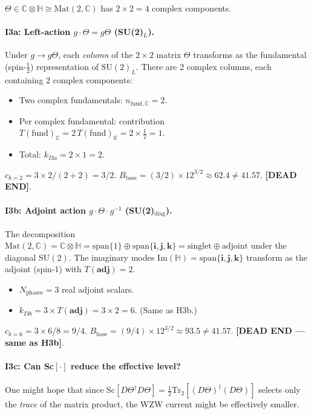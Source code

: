 \documentclass[11pt,a4paper]{article}
\theoremstyle{definition}
\theoremstyle{remark}
\begin{document}
$\Theta \in \mathbb{C}\otimes\mathbb{H} \cong \mathrm{Mat}(2,\mathbb{C})$
has $2\times 2 = 4$ complex components.

\paragraph{I3a: Left-action $g \cdot \Theta = g\Theta$ (SU(2)$_L$).}
Under $g \to g\Theta$, each \emph{column} of the $2\times 2$ matrix
$\Theta$ transforms as the fundamental (spin-$\tfrac{1}{2}$)
representation of $\mathrm{SU}(2)_L$.  There are 2 complex columns,
each containing 2 complex components:
\begin{itemize}
  \item Two complex fundamentals: $n_{\mathrm{fund,}\mathbb{C}} = 2$.
  \item Per complex fundamental: contribution $T(\mathrm{fund})_\mathbb{C}
    = 2\,T(\mathrm{fund})_\mathbb{R} = 2\times\tfrac{1}{2} = 1$.
  \item Total: $k_{I3a} = 2 \times 1 = 2$.
\end{itemize}
$c_{k=2} = 3\times 2/(2+2) = 3/2$.
$B_{\mathrm{base}} = (3/2)\times 12^{3/2} \approx 62.4 \neq 41.57$.
\textbf{[DEAD END]}.

\paragraph{I3b: Adjoint action $g \cdot \Theta \cdot g^{-1}$
(SU(2)$_{\mathrm{diag}}$).}
The decomposition $\mathrm{Mat}(2,\mathbb{C}) = \mathbb{C}\otimes\mathbb{H}
= \mathrm{span}\{1\} \oplus \mathrm{span}\{\mathbf{i},\mathbf{j},\mathbf{k}\}
= \mathrm{singlet} \oplus \mathrm{adjoint}$
under the diagonal $\mathrm{SU}(2)$.
The imaginary modes $\mathrm{Im}(\mathbb{H}) = \mathrm{span}\{\mathbf{i},
\mathbf{j},\mathbf{k}\}$ transform as the adjoint (spin-1) with $T(\mathbf{adj}) = 2$.
\begin{itemize}
  \item $N_{\mathrm{phases}} = 3$ real adjoint scalars.
  \item $k_{I3b} = 3 \times T(\mathbf{adj}) = 3 \times 2 = 6$.
    (Same as H3b.)
\end{itemize}
$c_{k=6} = 3\times 6/8 = 9/4$.
$B_{\mathrm{base}} = (9/4)\times 12^{3/2} \approx 93.5 \neq 41.57$.
\textbf{[DEAD END — same as H3b]}.

\paragraph{I3c: Can Sc$[\cdot]$ reduce the effective level?}
One might hope that since Sc$[D\Theta^\dagger D\Theta]
= \frac{1}{2}\mathrm{Tr}_2[(D\Theta)^\dagger(D\Theta)]$
selects only the \emph{trace} of the matrix product, the WZW
current might be effectively smaller.
\end{document}
